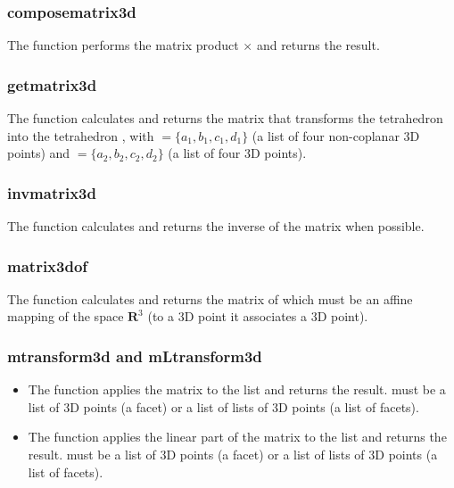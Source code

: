 \subsubsection{composematrix3d}
The function  performs the matrix product $\times$ and returns the result.

\subsubsection{getmatrix3d}
The function  calculates and returns the matrix that transforms the tetrahedron  into the tetrahedron , with $=\{a_1,b_1,c_1,d_1\}$ (a list of four non-coplanar 3D points) and $=\{a_2,b_2,c_2,d_2\}$ (a list of four 3D points).

\subsubsection{invmatrix3d}
The function  calculates and returns the inverse of the matrix  when possible.

\subsubsection{matrix3dof}

The function  calculates and returns the matrix of  which must be an affine mapping of the space $\mathbf R^3$ (to a 3D point it associates a 3D point).

\subsubsection{mtransform3d and mLtransform3d}

\begin{itemize}
\item The function  applies the matrix  to the list  and returns the result.  must be a list of 3D points (a facet) or a list of lists of 3D points (a list of facets).
\item The function  applies the linear part of the matrix  to the list  and returns the result.  must be a list of 3D points (a facet) or a list of lists of 3D points (a list of facets).
\end{itemize}

